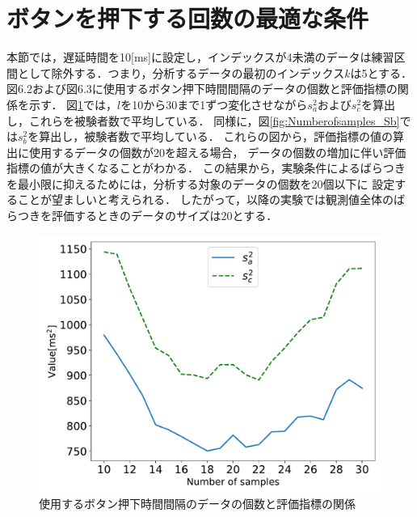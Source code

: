 \section{ボタンを押下する回数の最適な条件}
本節では，遅延時間を10[ms]に設定し，インデックスが4未満のデータは練習区間として除外する．つまり，分析するデータの最初のインデックス$k$は5とする．
図6.2および図6.3に使用するボタン押下時間間隔のデータの個数と評価指標の関係を示す．
図\ref{fig:NumberofSamples_Sa_Sc}では，$l$を10から30まで1ずつ変化させながら$s^2_{a}$および$s^2_{c}$を算出し，これらを被験者数で平均している．
同様に，図\ref{fig:Numberofsamples_Sb}では$s^2_{b}$を算出し，被験者数で平均している．
これらの図から，評価指標の値の算出に使用するデータの個数が20を超える場合，
データの個数の増加に伴い評価指標の値が大きくなることがわかる．
この結果から，実験条件によるばらつきを最小限に抑えるためには，分析する対象のデータの個数を20個以下に
設定することが望ましいと考えられる．
したがって，以降の実験では観測値全体のばらつきを評価するときのデータのサイズは20とする．
\begin{figure}[bt]
  \centering
  \includegraphics[scale=0.6]{figures/Yobi/Var/NumberOfSamples_varSaSc.pdf}
  \caption{使用するボタン押下時間間隔のデータの個数と評価指標の関係}
  \label{fig:NumberofSamples_Sa_Sc}
\end{figure}
